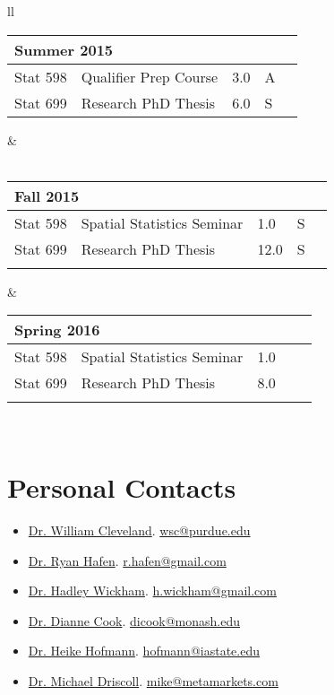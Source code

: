 \documentclass[oneside]{article}
\newcommand{\semtable}[1]{
  \begin{tabular}{p{1.5cm} p{3.5cm} p{.3cm} p{.3cm} p{0.75cm}}
    \multicolumn{5}{l}{#1}\\
    \hline
}
\newcommand{\semtableend}{
  \\
  \end{tabular}
}
\begin{document}
{\begin{tabular}{ll}
    \semtable{Summer 2015}
      Stat 598 & Qualifier Prep Course & 3.0 & A & \\
      Stat 699 & Research PhD Thesis & 6.0 & S &
    \semtableend
    &
    \\
	\\



    \semtable{Fall 2015}
      Stat 598 & Spatial Statistics Seminar & 1.0 & S & \\
      Stat 699 & Research PhD Thesis & 12.0 & S & \\
    \semtableend
    &
    \semtable{Spring 2016}
      Stat 598 & Spatial Statistics Seminar & 1.0 &  & \\
      Stat 699 & Research PhD Thesis & 8.0 &  & \\
    \semtableend
    \\



  \end{tabular}
} %


\section{Personal Contacts}

  \begin{itemize}

    \item \href{http://www.stat.purdue.edu/~wsc/}{Dr. William Cleveland}. \href{mailto:wsc@purdue.edu}{wsc@purdue.edu}

    \item \href{http://ryanhafen.com/}{Dr. Ryan Hafen}. \href{mailto:r.hafen@gmail.com}{r.hafen@gmail.com}

    \item \href{http://had.co.nz/}{Dr. Hadley Wickham}.  \href{mailto:h.wickham@gmail.com}{h.wickham@gmail.com}

    \item \href{http://dicook.github.io/}{Dr. Dianne Cook}.  \href{mailto:dicook@monash.edu}{dicook@monash.edu}

    \item \href{https://github.com/heike}{Dr. Heike Hofmann}.  \href{mailto:hofmann@iastate.edu}{hofmann@iastate.edu}

    \item \href{https://www.linkedin.com/profile/view?id=413949}{Dr. Michael Driscoll}. \href{mailto:mike@metamarkets.com}{mike@metamarkets.com}

  \end{itemize}
\end{document}
